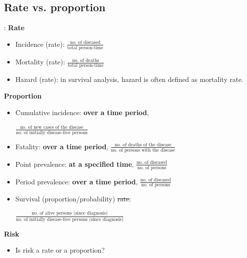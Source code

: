 \subsection{Rate vs. proportion}
\begin{frame}{\secname: \subsecname}
\textbf{Rate}
\begin{itemize}
	  \item<2|handout:2-> Incidence (rate): $\frac{\text{no. of diseased}}{\text{total person-time}}$
	  \item<3|handout:3-> Mortality (rate): $\frac{\text{no. of deaths}}{\text{total person-time}}$
	  \item<4|handout:4-> Hazard (rate): in survival analysis, hazard is often defined as mortality rate.
	  \end{itemize}
\textbf{Proportion}
	\begin{itemize}
	\item<5|handout:5-> Cumulative incidence: \textbf{over a time period}, \begin{small}
 	$\frac{\text{no. of new cases of the disease}}{\text{no. of initially disease-free persons}}$
 \end{small}
	\item<6|handout:6-> Fatality: \textbf{over a time period}, $\frac{\text{no. of deaths of the disease}}{\text{no. of persons with the disease}}$
	\item<7|handout:7-> Point prevalence: \textbf{at a specified time}, $\frac{\text{no. of diseased}}{\text{no. of persons}}$
	\item<7|handout:7-> Period prevalence: \textbf{over a time period}, $\frac{\text{no. of diseased}}{\text{no. of persons}}$
	\item<8|handout:8-> Survival (proportion/probability) \st{rate}: \begin{center}
 	$\frac{\text{no. of alive persons (since diagnosis)}}{\text{no. of initially disease-free persons (since diagnosis)}}$
 \end{center}
	\end{itemize}
\textbf{Risk}
	\begin{itemize}
	\item<9|handout:9> Is risk a rate or a proportion?	
	\end{itemize}

\end{frame}
